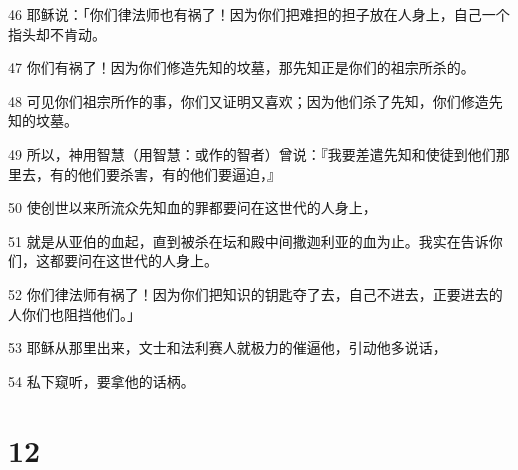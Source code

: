 \par 46 耶稣说：「你们律法师也有祸了！因为你们把难担的担子放在人身上，自己一个指头却不肯动。
\par 47 你们有祸了！因为你们修造先知的坟墓，那先知正是你们的祖宗所杀的。
\par 48 可见你们祖宗所作的事，你们又证明又喜欢；因为他们杀了先知，你们修造先知的坟墓。
\par 49 所以，神用智慧（用智慧：或作的智者）曾说：『我要差遣先知和使徒到他们那里去，有的他们要杀害，有的他们要逼迫，』
\par 50 使创世以来所流众先知血的罪都要问在这世代的人身上，
\par 51 就是从亚伯的血起，直到被杀在坛和殿中间撒迦利亚的血为止。我实在告诉你们，这都要问在这世代的人身上。
\par 52 你们律法师有祸了！因为你们把知识的钥匙夺了去，自己不进去，正要进去的人你们也阻挡他们。」
\par 53 耶稣从那里出来，文士和法利赛人就极力的催逼他，引动他多说话，
\par 54 私下窥听，要拿他的话柄。

\chapter{12}

